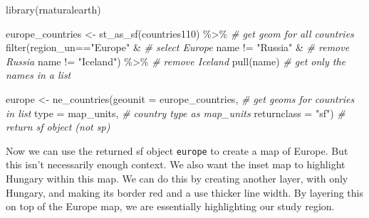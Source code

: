\documentclass[
]{book}
\makeatletter
\newenvironment{Shaded}{\begin{snugshade}}{\end{snugshade}}
\newcommand{\AttributeTok}[1]{\textcolor[rgb]{0.61,0.61,0.61}{#1}}
\newcommand{\CommentTok}[1]{\textcolor[rgb]{0.37,0.37,0.37}{\textit{#1}}}
\newcommand{\FunctionTok}[1]{\textcolor[rgb]{0,0,0}{#1}}
\newcommand{\NormalTok}[1]{#1}
\newcommand{\OtherTok}[1]{\textcolor[rgb]{0.37,0.37,0.37}{#1}}
\newcommand{\SpecialCharTok}[1]{\textcolor[rgb]{0,0,0}{#1}}
\newcommand{\StringTok}[1]{\textcolor[rgb]{0.5,0.5,0.5}{#1}}
\newenvironment{kframe}{%
\medskip{}
\setlength{\fboxsep}{.8em}
 \def\at@end@of@kframe{}%
 \ifinner\ifhmode%
  \def\at@end@of@kframe{\end{minipage}}%
  \begin{minipage}{\columnwidth}%
 \fi\fi%
 \def\FrameCommand##1{\hskip\@totalleftmargin \hskip-\fboxsep
 \colorbox{shadecolor}{##1}\hskip-\fboxsep
     \hskip-\linewidth \hskip-\@totalleftmargin \hskip\columnwidth}%
 \MakeFramed {\advance\hsize-\width
   \@totalleftmargin\z@ \linewidth\hsize
   \@setminipage}}%
 {\par\unskip\endMakeFramed%
 \at@end@of@kframe}
\renewenvironment{Shaded}{\begin{kframe}}{\end{kframe}}
\makeatother
\begin{document}
\begin{Shaded}
\begin{Highlighting}[]
\FunctionTok{library}\NormalTok{(rnaturalearth)}

\NormalTok{europe\_countries }\OtherTok{\textless{}{-}} \FunctionTok{st\_as\_sf}\NormalTok{(countries110) }\SpecialCharTok{\%\textgreater{}\%}  \CommentTok{\# get geom for all countries}
  \FunctionTok{filter}\NormalTok{(region\_un}\SpecialCharTok{==}\StringTok{"Europe"} \SpecialCharTok{\&} \CommentTok{\# select Europe}
\NormalTok{           name }\SpecialCharTok{!=} \StringTok{"Russia"} \SpecialCharTok{\&}   \CommentTok{\# remove Russia}
\NormalTok{           name }\SpecialCharTok{!=} \StringTok{"Iceland"}\NormalTok{) }\SpecialCharTok{\%\textgreater{}\%} \CommentTok{\# remove Iceland}
  \FunctionTok{pull}\NormalTok{(name) }\CommentTok{\# get only the names in a list}

\NormalTok{europe }\OtherTok{\textless{}{-}} \FunctionTok{ne\_countries}\NormalTok{(}\AttributeTok{geounit =}\NormalTok{ europe\_countries, }\CommentTok{\# get geoms for countries in list}
                       \AttributeTok{type =} \StringTok{\textquotesingle{}map\_units\textquotesingle{}}\NormalTok{,  }\CommentTok{\# country type as map\_units}
                       \AttributeTok{returnclass =} \StringTok{"sf"}\NormalTok{) }\CommentTok{\# return sf object (not sp)}
\end{Highlighting}
\end{Shaded}

Now we can use the returned sf object \texttt{europe} to create a map of Europe. But this isn't necessarily enough context. We also want the inset map to highlight Hungary within this map. We can do this by creating another layer, with only Hungary, and making its border red and a use thicker line width. By layering this on top of the Europe map, we are essentially highlighting our study region.
\end{document}
